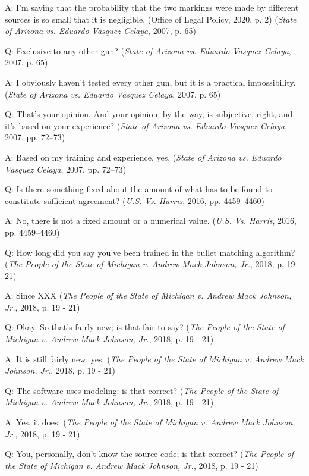 \documentclass[print]{nuthesis}
\begin{document}
A: I'm saying that the probability that the two markings were made by different sources is so small that it is negligible. (Office of Legal Policy, 2020, p. 2) (\emph{State of {Arizona} vs. Eduardo {Vasquez} {Celaya}}, 2007, p. 65)

Q: Exclusive to any other gun? (\emph{State of {Arizona} vs. Eduardo {Vasquez} {Celaya}}, 2007, p. 65)

A: I obviously haven't tested every other gun, but it is a practical impossibility. (\emph{State of {Arizona} vs. Eduardo {Vasquez} {Celaya}}, 2007, p. 65)

Q: That's your opinion. And your opinion, by the way, is subjective, right, and it's based on your experience? (\emph{State of {Arizona} vs. Eduardo {Vasquez} {Celaya}}, 2007, pp. 72--73)

A: Based on my training and experience, yes. (\emph{State of {Arizona} vs. Eduardo {Vasquez} {Celaya}}, 2007, pp. 72--73)

Q: Is there something fixed about the amount of what has to be found to constitute sufficient agreement? (\emph{{U.S.} Vs. {Harris}}, 2016, pp. 4459--4460)

A: No, there is not a fixed amount or a numerical value. (\emph{{U.S.} Vs. {Harris}}, 2016, pp. 4459--4460)

Q: How long did you say you've been trained in the bullet matching algorithm? (\emph{The {People} of the {State} of {Michigan} v. Andrew {Mack} {Johnson}, {Jr.}}, 2018, p. 19 - 21)

A: Since XXX (\emph{The {People} of the {State} of {Michigan} v. Andrew {Mack} {Johnson}, {Jr.}}, 2018, p. 19 - 21)

Q: Okay. So that's fairly new; is that fair to say? (\emph{The {People} of the {State} of {Michigan} v. Andrew {Mack} {Johnson}, {Jr.}}, 2018, p. 19 - 21)

A: It is still fairly new, yes. (\emph{The {People} of the {State} of {Michigan} v. Andrew {Mack} {Johnson}, {Jr.}}, 2018, p. 19 - 21)

Q: The software uses modeling; is that correct? (\emph{The {People} of the {State} of {Michigan} v. Andrew {Mack} {Johnson}, {Jr.}}, 2018, p. 19 - 21)

A: Yes, it does. (\emph{The {People} of the {State} of {Michigan} v. Andrew {Mack} {Johnson}, {Jr.}}, 2018, p. 19 - 21)

Q: You, personally, don't know the source code; is that correct? (\emph{The {People} of the {State} of {Michigan} v. Andrew {Mack} {Johnson}, {Jr.}}, 2018, p. 19 - 21)
\end{document}
